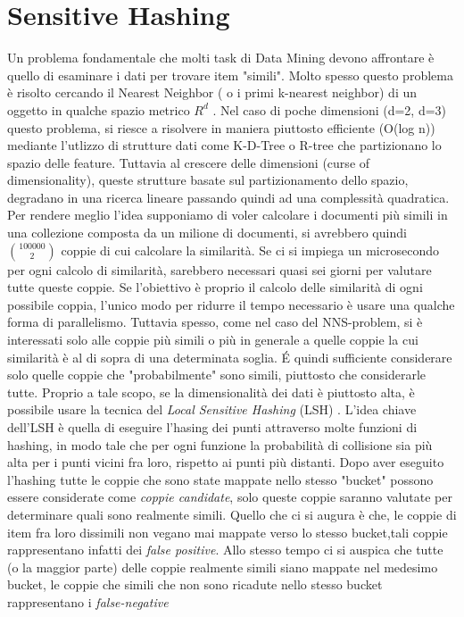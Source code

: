 \section{Sensitive Hashing}
Un problema fondamentale che molti task di Data Mining devono affrontare è quello di esaminare i dati per trovare item "simili". Molto spesso questo problema è risolto cercando il Nearest Neighbor ( o i primi k-nearest neighbor) di un oggetto in qualche spazio metrico $R^d$ .
Nel caso di poche dimensioni (d=2, d=3) questo problema, si riesce a risolvere in maniera piuttosto efficiente (O(log n)) mediante l'utlizzo di strutture dati come K-D-Tree o R-tree che partizionano lo spazio delle feature. Tuttavia al crescere delle dimensioni (curse of dimensionality), queste strutture basate sul partizionamento dello spazio, degradano in una ricerca lineare \cite{Weber:1998:QAP:645924.671192} passando quindi ad una complessità quadratica.
Per rendere meglio l'idea supponiamo di voler calcolare i documenti più simili in una collezione composta da un milione di documenti, si avrebbero quindi  $\binom{100000}{2}$  coppie di cui calcolare la similarità. Se ci si impiega un microsecondo per ogni calcolo di similarità, sarebbero necessari quasi sei giorni per valutare tutte queste coppie.
Se l'obiettivo è proprio il calcolo delle similarità di ogni possibile coppia, l'unico modo per ridurre il tempo necessario è usare una qualche forma di parallelismo. Tuttavia spesso, come nel caso del NNS-problem, si è interessati solo alle coppie più simili o più in generale a quelle coppie la cui similarità è al di sopra di una determinata soglia. \'E quindi sufficiente considerare solo quelle coppie che "probabilmente" sono simili, piuttosto che considerarle tutte. Proprio a tale scopo, se la dimensionalità dei dati è piuttosto alta, è possibile usare la tecnica del \emph{Local Sensitive Hashing} (LSH) \cite{Lsh} \cite{Gionis:1999}. L'idea chiave dell'LSH è quella di eseguire l'hasing dei punti attraverso molte funzioni di hashing, in modo tale che per ogni funzione la probabilità di collisione sia più alta per i punti vicini fra loro, rispetto ai punti più distanti.
Dopo aver eseguito l'hashing  tutte le coppie che sono state mappate nello stesso "bucket" possono essere considerate come \emph{coppie candidate}, solo queste coppie saranno valutate per determinare quali sono realmente simili. Quello che ci si augura è che, le coppie di item fra loro dissimili non vegano mai mappate verso lo stesso bucket,tali coppie rappresentano infatti dei \emph{false positive}. Allo stesso tempo ci si auspica che tutte (o la maggior parte) delle coppie realmente simili siano mappate nel medesimo bucket, le coppie che simili che non sono ricadute nello stesso bucket rappresentano i \emph{false-negative}
